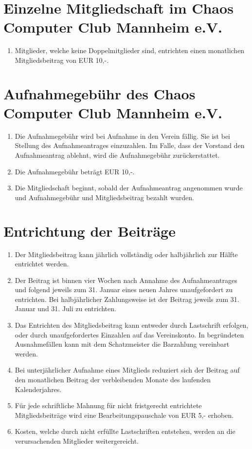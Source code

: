 \documentclass[a4paper, 12pt]{scrartcl}
\begin{document}
\section{Einzelne Mitgliedschaft im Chaos Computer Club Mannheim e.V.}
\label{mitgliedsbeitrag}
\begin{enumerate}
	\item Mitglieder, welche keine Doppelmitglieder sind, entrichten einen monatlichen Mitgliedsbeitrag von EUR 10,-.
\end{enumerate}

\section{Aufnahmegebühr des Chaos Computer Club Mannheim e.V.}
\begin{enumerate}
	\item Die Aufnahmegebühr wird bei Aufnahme in den Verein fällig. Sie ist bei Stellung des Aufnahmeantrages einzuzahlen. Im Falle, dass der Vorstand den Aufnahmeantrag ablehnt, wird die Aufnahmegebühr zurückerstattet.
	\item Die Aufnahmegebühr beträgt EUR 10,-.
	\item Die Mitgliedschaft beginnt, sobald der Aufnahmeantrag angenommen wurde und Aufnahmegebühr und Mitgliedsbeitrag bezahlt wurden.
\end{enumerate}

\section{Entrichtung der Beiträge}
  \begin{enumerate}
    \item Der Mitgliedsbeitrag kann jährlich vollständig oder halbjährlich zur Hälfte entrichtet werden.
    \item Der Beitrag ist binnen vier Wochen nach Annahme des Aufnahmeantrages und folgend jeweils zum 31. Januar eines neuen Jahres unaufgefordert zu entrichten. Bei halbjährlicher Zahlungsweise ist der Beitrag jeweils zum 31. Januar und 31. Juli zu entrichten.
    \item Das Entrichten des Mitgliedsbeitrag kann entweder durch Lastschrift erfolgen, oder durch unaufgefordertes Einzahlen auf das Vereinskonto. In begründeten Ausnahmefällen kann mit dem Schatzmeister die Barzahlung vereinbart werden.
    \item Bei unterjährlicher Aufnahme eines Mitglieds reduziert sich der Beitrag auf den monatlichen Beitrag der verbleibenden Monate des laufenden Kalenderjahres.
    \item Für jede schriftliche Mahnung für nicht fristgerecht entrichtete Mitgliedsbeiträge wird eine Bearbeitungspauschale von EUR 5,- erhoben. 
    \item Kosten, welche durch nicht erfüllte Lastschriften entstehen, werden an die verursachenden Mitglieder weitergereicht.
  \end{enumerate}
\end{document}
